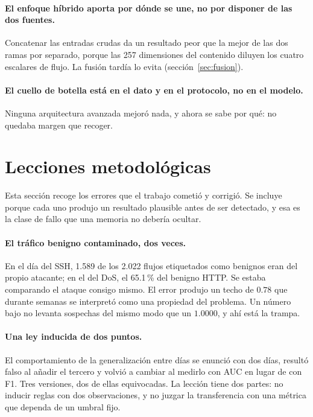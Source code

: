 \paragraph{El enfoque híbrido aporta por dónde se une, no por disponer de las dos
fuentes.} Concatenar las entradas crudas da un resultado peor que la mejor de las
dos ramas por separado, porque las 257 dimensiones del contenido diluyen los
cuatro escalares de flujo. La fusión tardía lo evita
(sección~\ref{sec:fusion}).

\paragraph{El cuello de botella está en el dato y en el protocolo, no en el
modelo.} Ninguna arquitectura avanzada mejoró nada, y ahora se sabe por qué: no
quedaba margen que recoger.

\section{Lecciones metodológicas}
\label{sec:lecciones}

Esta sección recoge los errores que el trabajo cometió y corrigió. Se incluye
porque cada uno produjo un resultado plausible antes de ser detectado, y esa es
la clase de fallo que una memoria no debería ocultar.

\paragraph{El tráfico benigno contaminado, dos veces.} En el día del SSH, 1.589
de los 2.022 flujos etiquetados como benignos eran del propio atacante; en el
del DoS, el 65.1\,\% del benigno HTTP. Se estaba comparando el ataque consigo
mismo. El error produjo un techo de $0.78$ que durante semanas se interpretó
como una propiedad del problema. Un número bajo no levanta sospechas del mismo
modo que un $1.0000$, y ahí está la trampa.

\paragraph{Una ley inducida de dos puntos.} El comportamiento de la
generalización entre días se enunció con dos días, resultó falso al añadir el
tercero y volvió a cambiar al medirlo con AUC en lugar de con F1. Tres
versiones, dos de ellas equivocadas. La lección tiene dos partes: no inducir
reglas con dos observaciones, y no juzgar la transferencia con una métrica que
dependa de un umbral fijo.

